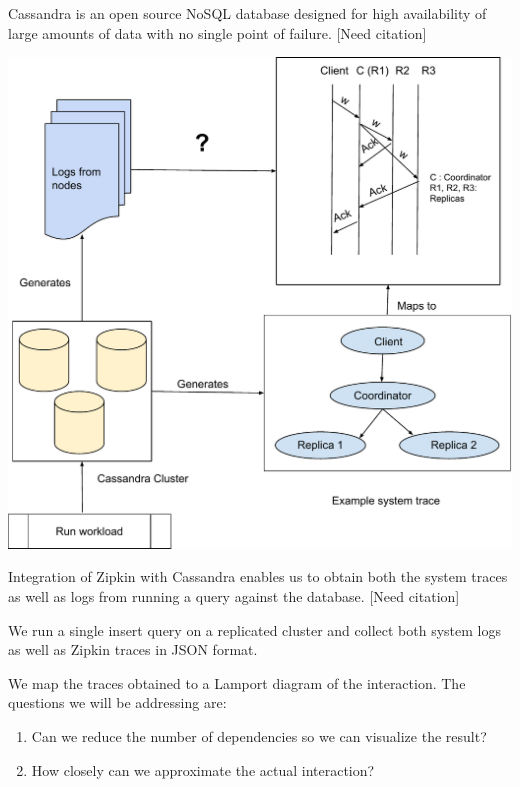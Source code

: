 Cassandra is an open source NoSQL database designed for high availability of large amounts of data with no single point of failure. [Need citation]

\includegraphics[scale=0.35]{figures/system_model.pdf}

Integration of Zipkin with Cassandra enables us to obtain both the system traces as well as logs from running a query against the database. [Need citation]

We run a single insert query on a replicated cluster and collect both system logs as well as Zipkin traces in JSON format. 

We map the traces obtained to a Lamport diagram of the interaction. The questions we will be addressing are:
\begin{enumerate}
\item Can we reduce the number of dependencies so we can visualize the result?
\item How closely can we approximate the actual interaction?
\end{enumerate}
